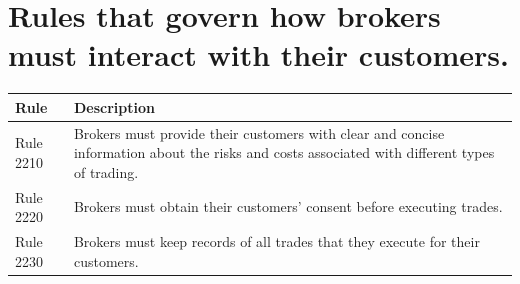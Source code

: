 \documentclass[11pt]{article}
\begin{document}
\section{Rules that govern how brokers must interact with their customers.}
\label{sec:orgadad595}
\begin{center}
\begin{tabular}{ll}
\hline
Rule & Description\\[0pt]
\hline
Rule 2210 & Brokers must provide their customers with clear and concise information about the risks and costs associated with different types of trading.\\[0pt]
Rule 2220 & Brokers must obtain their customers' consent before executing trades.\\[0pt]
Rule 2230 & Brokers must keep records of all trades that they execute for their customers.\\[0pt]
\hline
\end{tabular}
\end{center}
\end{document}
